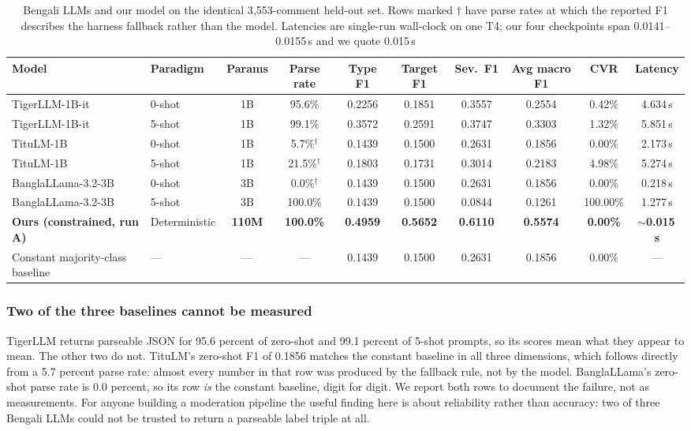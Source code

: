 \documentclass[conference]{IEEEtran}
\begin{document}
\begin{table}[t]
\caption{Bengali LLMs and our model on the identical 3{,}553-comment held-out set.
Rows marked $\dagger$ have parse rates at which the reported F1 describes the
harness fallback rather than the model. Latencies are single-run wall-clock on
one T4; our four checkpoints span 0.0141--0.0155\,s and we quote 0.015\,s}
\label{tab:llm}
\centering
\footnotesize
\begin{tabular}{llcccccccc}
\toprule
\textbf{Model} & \textbf{Paradigm} & \textbf{Params} & \textbf{Parse rate} & \textbf{Type F1} & \textbf{Target F1} & \textbf{Sev.\ F1} & \textbf{Avg macro F1} & \textbf{CVR} & \textbf{Latency} \\
\midrule
TigerLLM-1B-it \cite{raihan2025tigerllm} & 0-shot & 1B & 95.6\% & 0.2256 & 0.1851 & 0.3557 & 0.2554 & 0.42\% & 4.634\,s \\
TigerLLM-1B-it \cite{raihan2025tigerllm} & 5-shot & 1B & 99.1\% & 0.3572 & 0.2591 & 0.3747 & 0.3303 & 1.32\% & 5.851\,s \\
TituLM-1B \cite{hishab2024titullm} & 0-shot & 1B & 5.7\%$^\dagger$ & 0.1439 & 0.1500 & 0.2631 & 0.1856 & 0.00\% & 2.173\,s \\
TituLM-1B \cite{hishab2024titullm} & 5-shot & 1B & 21.5\%$^\dagger$ & 0.1803 & 0.1731 & 0.3014 & 0.2183 & 4.98\% & 5.274\,s \\
BanglaLLama-3.2-3B \cite{banglallm2024bongllama} & 0-shot & 3B & 0.0\%$^\dagger$ & 0.1439 & 0.1500 & 0.2631 & 0.1856 & 0.00\% & 0.218\,s \\
BanglaLLama-3.2-3B \cite{banglallm2024bongllama} & 5-shot & 3B & 100.0\% & 0.1439 & 0.1500 & 0.0844 & 0.1261 & 100.00\% & 1.277\,s \\
\midrule
\textbf{Ours (constrained, run A)} & Deterministic & \textbf{110M} & \textbf{100.0\%} & \textbf{0.4959} & \textbf{0.5652} & \textbf{0.6110} & \textbf{0.5574} & \textbf{0.00\%} & \textbf{$\sim$0.015\,s} \\
\midrule
Constant majority-class baseline & --- & --- & --- & 0.1439 & 0.1500 & 0.2631 & 0.1856 & 0.00\% & --- \\
\bottomrule
\end{tabular}
\end{table}

\subsubsection{Two of the three baselines cannot be measured}
TigerLLM returns parseable JSON for 95.6 percent of zero-shot and 99.1 percent of 5-shot prompts, so its scores mean what they appear to mean. The other two do not. TituLM's zero-shot F1 of 0.1856 matches the constant baseline in all three dimensions, which follows directly from a 5.7 percent parse rate: almost every number in that row was produced by the fallback rule, not by the model. BanglaLLama's zero-shot parse rate is 0.0 percent, so its row \emph{is} the constant baseline, digit for digit. We report both rows to document the failure, not as measurements. For anyone building a moderation pipeline the useful finding here is about reliability rather than accuracy: two of three Bengali LLMs could not be trusted to return a parseable label triple at all.
\end{document}
